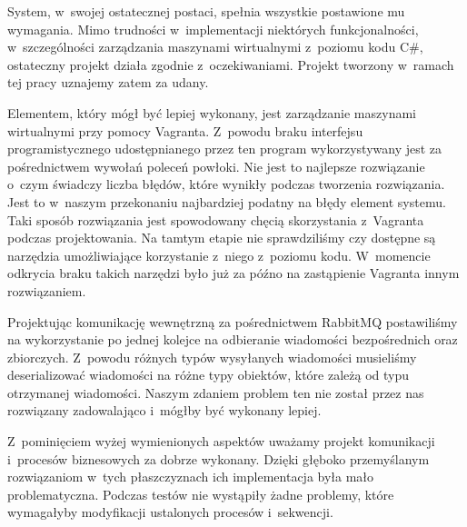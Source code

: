 \documentclass[../podsumowanie.tex]{subfiles}
\begin{document}
\label{final_system_form}

System, w~swojej ostatecznej postaci, spełnia wszystkie postawione mu wymagania. Mimo trudności w~implementacji niektórych funkcjonalności, w~szczególności zarządzania maszynami wirtualnymi z~poziomu kodu C\#, ostateczny projekt działa zgodnie z~oczekiwaniami. Projekt tworzony w~ramach tej pracy uznajemy zatem za udany.

Elementem, który mógł być lepiej wykonany, jest zarządzanie maszynami wirtualnymi przy pomocy Vagranta. Z~powodu braku interfejsu programistycznego udostępnianego przez ten program wykorzystywany jest za pośrednictwem wywołań poleceń powłoki. Nie jest to najlepsze rozwiązanie o~czym świadczy liczba błędów, które wynikły podczas tworzenia rozwiązania. Jest to w~naszym przekonaniu najbardziej podatny na błędy element systemu. Taki sposób rozwiązania jest spowodowany chęcią skorzystania z~Vagranta podczas projektowania. Na tamtym etapie nie sprawdziliśmy czy dostępne są narzędzia umożliwiające korzystanie z~niego z~poziomu kodu. W~momencie odkrycia braku takich narzędzi było już za późno na zastąpienie Vagranta innym rozwiązaniem.

Projektując komunikację wewnętrzną za pośrednictwem RabbitMQ postawiliśmy na wykorzystanie po jednej kolejce na odbieranie wiadomości bezpośrednich oraz zbiorczych.
Z~powodu różnych typów wysyłanych wiadomości musieliśmy deserializować wiadomości na różne typy obiektów, które zależą od typu otrzymanej wiadomości.
Naszym zdaniem problem ten nie został przez nas rozwiązany zadowalająco i~mógłby być wykonany lepiej.

Z~pominięciem wyżej wymienionych aspektów uważamy projekt komunikacji i~procesów biznesowych za dobrze wykonany.
Dzięki głęboko przemyślanym rozwiązaniom w~tych płaszczyznach ich implementacja była mało problematyczna.
Podczas testów nie wystąpiły żadne problemy, które wymagałyby modyfikacji ustalonych procesów i~sekwencji.
\end{document}
